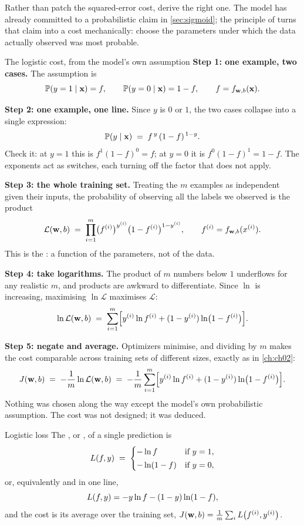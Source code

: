 Rather than patch the squared-error cost, derive the right one. The model has
already committed to a probabilistic claim in \cref{sec:sigmoid}; the principle
of  turns that claim into a cost mechanically: choose
the parameters under which the data actually observed was most probable.

\begin{derivation}{The logistic cost, from the model's own assumption}
\textbf{Step 1: one example, two cases.} The assumption is
\[
  \mathbb{P}(y=1\mid\mathbf{x}) = f, \qquad \mathbb{P}(y=0\mid\mathbf{x}) = 1-f,
  \qquad f = f_{\mathbf{w},b}(\mathbf{x}).
\]

\textbf{Step 2: one example, one line.} Since $y$ is $0$ or $1$, the two cases
collapse into a single expression:
\[
  \mathbb{P}(y\mid\mathbf{x}) \;=\; f^{\,y}\,(1-f)^{\,1-y}.
\]
Check it: at $y=1$ this is $f^1(1-f)^0 = f$; at $y=0$ it is $f^0(1-f)^1 = 1-f$.
The exponents act as switches, each turning off the factor that does not apply.

\textbf{Step 3: the whole training set.} Treating the $m$ examples as
independent given their inputs, the probability of observing all the labels we
observed is the product
\[
  \mathcal{L}(\mathbf{w},b) \;=\; \prod_{i=1}^{m}
    \bigl(f^{(i)}\bigr)^{y^{(i)}}\bigl(1-f^{(i)}\bigr)^{1-y^{(i)}},
  \qquad f^{(i)} = f_{\mathbf{w},b}(x^{(i)}).
\]
This is the : a function of the parameters, not of the data.

\textbf{Step 4: take logarithms.} The product of $m$ numbers below $1$
underflows for any realistic $m$, and products are awkward to differentiate.
Since $\ln$ is increasing, maximising $\ln\mathcal{L}$ maximises $\mathcal{L}$:
\[
  \ln\mathcal{L}(\mathbf{w},b) \;=\; \sum_{i=1}^{m}
    \Bigl[y^{(i)}\ln f^{(i)} + (1-y^{(i)})\ln\bigl(1-f^{(i)}\bigr)\Bigr].
\]

\textbf{Step 5: negate and average.} Optimizers minimise, and dividing by $m$
makes the cost comparable across training sets of different sizes, exactly as in
\cref{ch:ch02}:
\[
  J(\mathbf{w},b) \;=\; -\frac{1}{m}\ln\mathcal{L}(\mathbf{w},b)
  \;=\; -\frac{1}{m}\sum_{i=1}^{m}
    \Bigl[y^{(i)}\ln f^{(i)} + (1-y^{(i)})\ln\bigl(1-f^{(i)}\bigr)\Bigr].
\]
Nothing was chosen along the way except the model's own probabilistic
assumption. The cost was not designed; it was deduced.
\end{derivation}

\begin{defbox}{Logistic loss}
The , or , of a single prediction
is
\[
  L(f, y) \;=\;
  \begin{cases}
    -\ln f       & \text{if } y = 1,\\[2pt]
    -\ln(1-f)    & \text{if } y = 0,
  \end{cases}
\]
or, equivalently and in one line,
\[
  L(f,y) = -y\ln f - (1-y)\ln(1-f),
\]
and the cost is its average over the training set,
$J(\mathbf{w},b) = \frac1m\sum_{i} L\bigl(f^{(i)}, y^{(i)}\bigr)$.
\end{defbox}

